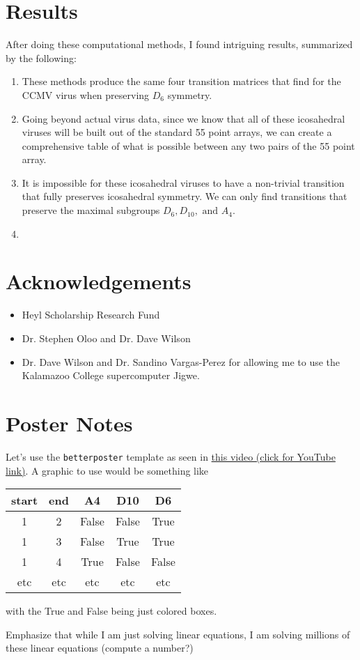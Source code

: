 \documentclass[a4paper,10pt]{article}
\theoremstyle{plain}
\theoremstyle{definition}
\theoremstyle{remark}
\begin{document}
\section{Results}
After doing these computational methods, I found intriguing results, summarized by the following:
\begin{enumerate}
    \item These methods produce the same four transition matrices that \cite{indelicatoetal2012} find for the CCMV virus when preserving \(D_6\) symmetry. \label{results-reproduce-indelicato}
    
    \item Going beyond actual virus data, since we know that all of these icosahedral viruses will be built out of the standard 55 point arrays, we can create a comprehensive table of what is possible between any two pairs of the 55 point array.

    \item It is impossible for these icosahedral viruses to have a non-trivial transition that fully preserves icosahedral symmetry. We can only find transitions that preserve the maximal subgroups \(D_6, D_{10}, \text{ and } A_4\). \label{results-impossiblity-of-ico}

    \item {}
\end{enumerate}

\section{Acknowledgements}
\begin{itemize}
    \item Heyl Scholarship Research Fund
    \item Dr. Stephen Oloo and Dr. Dave Wilson
    \item Dr. Dave Wilson and Dr. Sandino Vargas-Perez for allowing me to use the Kalamazoo College supercomputer Jigwe.
\end{itemize}

\section{Poster Notes}
Let's use the \texttt{betterposter} template as seen in \href{https://www.youtube.com/watch?v=SYk29tnxASs}{this video (click for YouTube link)}.
A graphic to use would be something like
\begin{center}
\begin{tabular}{c|c|ccc}
    start & end & A4 & D10 & D6 \\ \hline
    1 & 2 & {\color{red}False} & {\color{red}False} & {\color{green}True} \\
    1 & 3 & {\color{red}False} & {\color{green}True} & {\color{green}True} \\
    1 & 4 & {\color{green}True} & {\color{red}False} & {\color{red}False} \\
    etc & etc & etc & etc & etc
\end{tabular}
\end{center}
with the True and False being just colored boxes.

Emphasize that while I am just solving linear equations, I am solving millions of these linear equations (compute a number?)

\medskip

\end{document}
